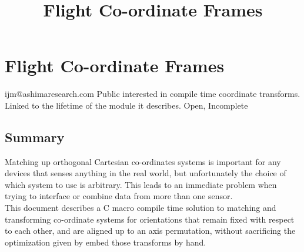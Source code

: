 \documentclass{article}
\begin{document}
\title{Flight Co-ordinate Frames}
\section{Flight Co-ordinate Frames}
{ijm@ashimaresearch.com}
{Public interested in compile time coordinate transforms.}
{Linked to the lifetime of the module it describes.}
{Open, Incomplete}
\subsection{Summary}
Matching up orthogonal Cartesian co-ordinates systems is important for
any devices that senses anything in the real world, but unfortunately
the choice of which system to use is arbitrary.  This leads to an
immediate problem when trying to interface or combine data from
more than one sensor.\\
This document describes a C macro compile time solution to matching
 and transforming co-ordinate systems for
orientations that remain fixed with respect to each other, and are
aligned up to an axis permutation, without sacrificing the optimization given by 
embed those transforms by hand.
\end{document}
